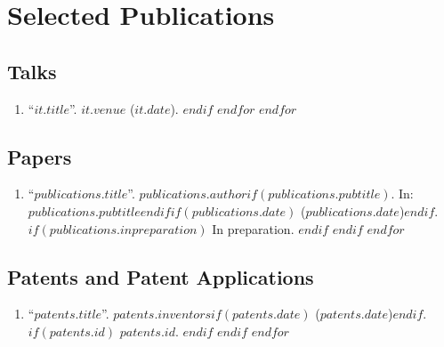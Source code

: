 \documentclass[11pt]{article}
\begin{document}
\section*{Selected Publications}
\subsection*{Talks}
\begin{enumerate}
$for(talks)$
$for(talks.entries)$
$if(it.selected)$
\item ``\href{$it.link$}{$it.title$}''. $it.venue$ ($it.date$).
$endif$
$endfor$
$endfor$
\end{enumerate}

\subsection*{Papers}
\begin{enumerate}
$for(publications)$
$if(it.selected)$
\item ``\href{$publications.link$}{$publications.title$}''. $publications.author$$if(publications.pubtitle)$. In: \emph{$publications.pubtitle$}$endif$$if(publications.date)$ ($publications.date$)$endif$.
$if(publications.inpreparation)$
In preparation.
$endif$
$endif$
$endfor$
\end{enumerate}

\subsection*{Patents and Patent Applications}
\begin{enumerate}
$for(patents)$
$if(it.hide)$
$else$
	\item ``$patents.title$''. $patents.inventors$$if(patents.date)$ ($patents.date$)$endif$.
	$if(patents.id)$
	$patents.id$.
	$endif$
$endif$
$endfor$
\end{enumerate}
\end{document}
